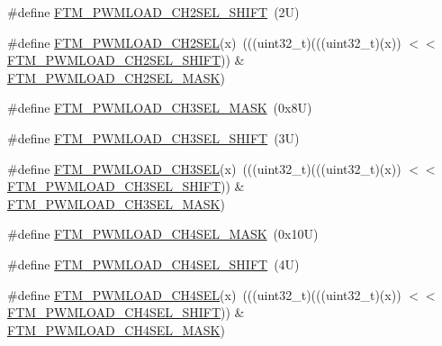 \begin{DoxyCompactItemize}
\#define \mbox{\hyperlink{group___f_t_m___register___masks_ga477fae93760ebabafd41a6be108c41a1}{F\+T\+M\+\_\+\+P\+W\+M\+L\+O\+A\+D\+\_\+\+C\+H2\+S\+E\+L\+\_\+\+S\+H\+I\+FT}}~(2\+U)
\item 
\#define \mbox{\hyperlink{group___f_t_m___register___masks_ga26bb85953a05f7cc5361ba19c0d370e0}{F\+T\+M\+\_\+\+P\+W\+M\+L\+O\+A\+D\+\_\+\+C\+H2\+S\+EL}}(x)~(((uint32\+\_\+t)(((uint32\+\_\+t)(x)) $<$$<$ \mbox{\hyperlink{group___f_t_m___register___masks_ga477fae93760ebabafd41a6be108c41a1}{F\+T\+M\+\_\+\+P\+W\+M\+L\+O\+A\+D\+\_\+\+C\+H2\+S\+E\+L\+\_\+\+S\+H\+I\+FT}})) \& \mbox{\hyperlink{group___f_t_m___register___masks_gabd7f8ac1fa597d6b97b85926ae9e6fec}{F\+T\+M\+\_\+\+P\+W\+M\+L\+O\+A\+D\+\_\+\+C\+H2\+S\+E\+L\+\_\+\+M\+A\+SK}})
\item 
\#define \mbox{\hyperlink{group___f_t_m___register___masks_gacbe9716a0b6c45b6e509f4060145ecc0}{F\+T\+M\+\_\+\+P\+W\+M\+L\+O\+A\+D\+\_\+\+C\+H3\+S\+E\+L\+\_\+\+M\+A\+SK}}~(0x8\+U)
\item 
\#define \mbox{\hyperlink{group___f_t_m___register___masks_ga2af1a060bebe8e48c468cce81a2364d8}{F\+T\+M\+\_\+\+P\+W\+M\+L\+O\+A\+D\+\_\+\+C\+H3\+S\+E\+L\+\_\+\+S\+H\+I\+FT}}~(3\+U)
\item 
\#define \mbox{\hyperlink{group___f_t_m___register___masks_ga3dc1ac539f974e6ff787e17537ac840e}{F\+T\+M\+\_\+\+P\+W\+M\+L\+O\+A\+D\+\_\+\+C\+H3\+S\+EL}}(x)~(((uint32\+\_\+t)(((uint32\+\_\+t)(x)) $<$$<$ \mbox{\hyperlink{group___f_t_m___register___masks_ga2af1a060bebe8e48c468cce81a2364d8}{F\+T\+M\+\_\+\+P\+W\+M\+L\+O\+A\+D\+\_\+\+C\+H3\+S\+E\+L\+\_\+\+S\+H\+I\+FT}})) \& \mbox{\hyperlink{group___f_t_m___register___masks_gacbe9716a0b6c45b6e509f4060145ecc0}{F\+T\+M\+\_\+\+P\+W\+M\+L\+O\+A\+D\+\_\+\+C\+H3\+S\+E\+L\+\_\+\+M\+A\+SK}})
\item 
\#define \mbox{\hyperlink{group___f_t_m___register___masks_ga5c780b58f08500bc357b62c904dc1c97}{F\+T\+M\+\_\+\+P\+W\+M\+L\+O\+A\+D\+\_\+\+C\+H4\+S\+E\+L\+\_\+\+M\+A\+SK}}~(0x10\+U)
\item 
\#define \mbox{\hyperlink{group___f_t_m___register___masks_gafdff910b7b4bc4961ef1852efddacbb5}{F\+T\+M\+\_\+\+P\+W\+M\+L\+O\+A\+D\+\_\+\+C\+H4\+S\+E\+L\+\_\+\+S\+H\+I\+FT}}~(4\+U)
\item 
\#define \mbox{\hyperlink{group___f_t_m___register___masks_gae89b817d5a34036c5016bab89d228429}{F\+T\+M\+\_\+\+P\+W\+M\+L\+O\+A\+D\+\_\+\+C\+H4\+S\+EL}}(x)~(((uint32\+\_\+t)(((uint32\+\_\+t)(x)) $<$$<$ \mbox{\hyperlink{group___f_t_m___register___masks_gafdff910b7b4bc4961ef1852efddacbb5}{F\+T\+M\+\_\+\+P\+W\+M\+L\+O\+A\+D\+\_\+\+C\+H4\+S\+E\+L\+\_\+\+S\+H\+I\+FT}})) \& \mbox{\hyperlink{group___f_t_m___register___masks_ga5c780b58f08500bc357b62c904dc1c97}{F\+T\+M\+\_\+\+P\+W\+M\+L\+O\+A\+D\+\_\+\+C\+H4\+S\+E\+L\+\_\+\+M\+A\+SK}})
$$
\end{DoxyCompactItemize}
